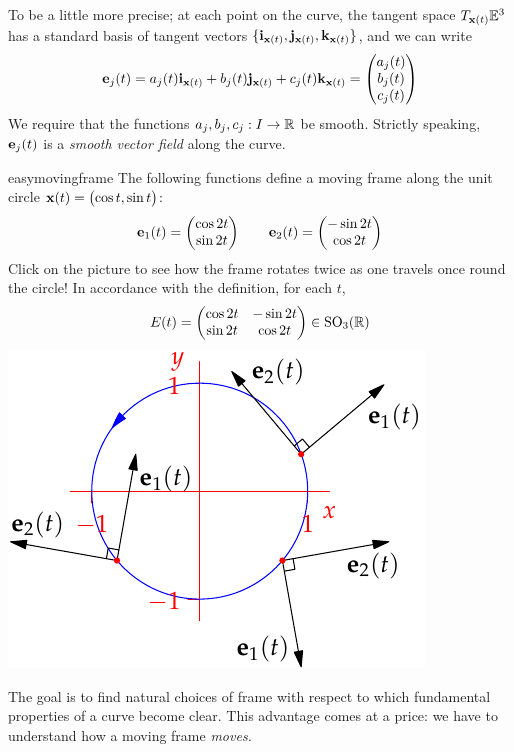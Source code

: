 To be a little more precise; at each point on the curve, the tangent space $T_{{\mathbf{x}}(t)}\mathbb{E}^3$ has a standard basis of tangent vectors $\{{\mathbf{i}}_{{\mathbf{x}}(t)},{\mathbf{j}}_{{\mathbf{x}}(t)},{\mathbf{k}}_{{\mathbf{x}}(t)}\}$, and we can write
\[{\mathbf{e}}_j(t)=a_j(t){\mathbf{i}}_{{\mathbf{x}}(t)}+b_j(t){\mathbf{j}}_{{\mathbf{x}}(t)}+c_j(t){\mathbf{k}}_{{\mathbf{x}}(t)} =\begin{pmatrix}a_j(t)\\b_j(t)\\c_j(t)\end{pmatrix}\]
We require that the functions $a_j,b_j,c_j:I\to \mathbb{R}$ be smooth. Strictly speaking, ${\mathbf{e}}_j(t)$ is a \emph{smooth vector field} along the curve.



\begin{example}[lower separated=false, sidebyside, sidebyside align=top seam, sidebyside gap=0pt, righthand width=0.4\linewidth]{}{easymovingframe}
The following functions define a moving frame along the unit circle ${\mathbf{x}}(t)=\bigl(\cos t,\sin t\bigr)$:
\[{\mathbf{e}}_1(t)=\begin{pmatrix}\cos 2t\\\sin 2t\end{pmatrix}\qquad {\mathbf{e}}_2(t)=\begin{pmatrix}-\sin 2t\\\cos 2t\end{pmatrix}\]
Click on the picture to see how the frame rotates twice as one travels once round the circle!\smallbreak
In accordance with the definition, for each $t$,
\[E(t)=\begin{pmatrix}
\cos 2t&-\sin 2t\\
\sin 2t&\cos 2t
\end{pmatrix}\in\mathrm{SO}_3(\mathbb{R})\]
\tcblower
\flushright\href{http://math.uci.edu/~ndonalds/math162a/vector-anim.html}{\includegraphics[scale=0.9]{vector-anim2}}
\end{example}

\goodbreak


The goal is to find natural choices of frame with respect to which fundamental properties of a curve become clear. This advantage comes at a price: we have to understand how a moving frame \emph{moves.}

